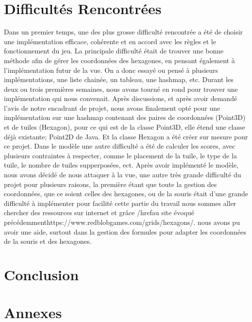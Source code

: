 \documentclass{article}
\begin{document}
    \section{Difficultés Rencontrées}\label{sec:difficultes-rencontrees}

    Dans un premier temps, une des plus grosse difficulté rencontrée a été de choisir une implémentation efficace, cohérente et en accord avec les règles et le fonctionnement du jeu.
    La principale difficulté était de trouver une bonne méthode afin de gérer les coordonnées des hexagones, en pensant également à l'implémentation futur de la vue.
    On a donc essayé ou pensé à plusieurs implémentations, une liste chainée, un tableau, une hashmap, etc.
    Durant les deux ou trois premières semaines, nous avons tourné en rond pour trouver une implémentation qui nous convenait.
    Après discussions, et après avoir demandé l'avis de notre encadrant de projet, nous avons finalement opté pour une implémentation sur une hashmap contenant des paires de coordonnées (Point3D) et de tuiles (Hexagon), pour ce qui est de la classe Point3D, elle étend une classe déjà existante; Point2D de Java.
    Et la classe Hexagon a été créer sur mesure pour ce projet.
    Dans le modèle une autre difficulté a été de calculer les scores, avec plusieurs contraintes à respecter, comme le placement de la tuile, le type de la tuile, le nombre de tuiles supperposées, ect.
    Après avoir implémenté le modèle, nous avons décidé de nous attaquer à la vue, une autre très grande difficulté du projet pour plusieurs raisons, 
    la première étant que toute la gestion des coordonnées, que ce soient celles des hexagones, ou de la souris était d'une grande difficulté à implémenter pour facilité cette partie du travail nous sommes aller chercher des ressources sur internet et grâce /href{au site évoqué précédemment}{https://www.redblobgames.com/grids/hexagons/}.
    nous avons pu avoir une aide, surtout dans la gestion des formules pour adapter les coordonnées de la souris et des hexagones.


    \section{Conclusion}\label{sec:conclusion}

    \section{Annexes}\label{sec:annexes}



    \tableofcontents
\end{document}
